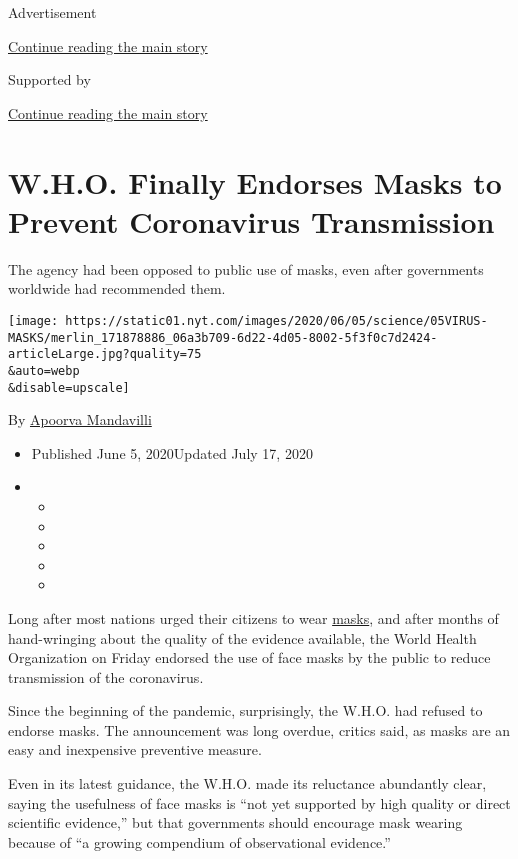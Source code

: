 Advertisement

\protect\hyperlink{after-top}{Continue reading the main story}

Supported by

\protect\hyperlink{after-sponsor}{Continue reading the main story}

\hypertarget{who-finally-endorses-masks-to-prevent-coronavirus-transmission}{%
\section{W.H.O. Finally Endorses Masks to Prevent Coronavirus
Transmission}\label{who-finally-endorses-masks-to-prevent-coronavirus-transmission}}

The agency had been opposed to public use of masks, even after
governments worldwide had recommended them.

\texttt{[image: https://static01.nyt.com/images/2020/06/05/science/05VIRUS-MASKS/merlin\_171878886\_06a3b709-6d22-4d05-8002-5f3f0c7d2424-articleLarge.jpg?quality=75\\\&auto=webp\\\&disable=upscale]}

By \href{https://www.nytimes.com/by/apoorva-mandavilli}{Apoorva
Mandavilli}

\begin{itemize}
\item
  Published June 5, 2020Updated July 17, 2020
\item
  \begin{itemize}
  \item
  \item
  \item
  \item
  \item
  \end{itemize}
\end{itemize}

Long after most nations urged their citizens to wear
\href{https://www.nytimes.com/article/face-shield-mask-california-coronavirus.html}{masks},
and after months of hand-wringing about the quality of the evidence
available, the World Health Organization on Friday endorsed the use of
face masks by the public to reduce transmission of the coronavirus.

Since the beginning of the pandemic, surprisingly, the W.H.O. had
refused to endorse masks. The announcement was long overdue, critics
said, as masks are an easy and inexpensive preventive measure.

Even in its latest guidance, the W.H.O. made its reluctance abundantly
clear, saying the usefulness of face masks is ``not yet supported by
high quality or direct scientific evidence,'' but that governments
should encourage mask wearing because of ``a growing compendium of
observational evidence.''


